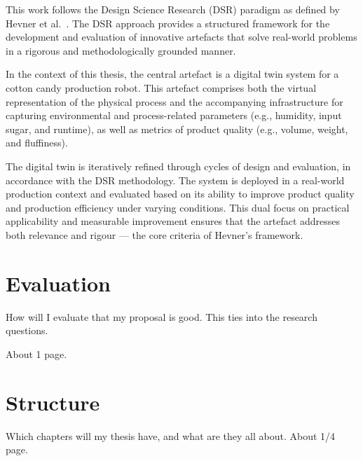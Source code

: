 This work follows the Design Science Research (DSR) paradigm as defined by Hevner et al.~\cite{Hevner2004}. The DSR approach provides a structured framework for the development and evaluation of innovative artefacts that solve real-world problems in a rigorous and methodologically grounded manner.

In the context of this thesis, the central artefact is a digital twin system for a cotton candy production robot. This artefact comprises both the virtual representation of the physical process and the accompanying infrastructure for capturing environmental and process-related parameters (e.g., humidity, input sugar, and runtime), as well as metrics of product quality (e.g., volume, weight, and fluffiness).

The digital twin is iteratively refined through cycles of design and evaluation, in accordance with the DSR methodology. The system is deployed in a real-world production context and evaluated based on its ability to improve product quality and production efficiency under varying conditions. This dual focus on practical applicability and measurable improvement ensures that the artefact addresses both relevance and rigour — the core criteria of Hevner’s framework.

\section{Evaluation}
\label{sec:intro:ev}

How will I evaluate that my proposal is good. This ties into the research questions.

About 1 page.

\section{Structure}
\label{sec:intro:struct}

Which chapters will my thesis have, and what are they all about.
About 1/4 page.

